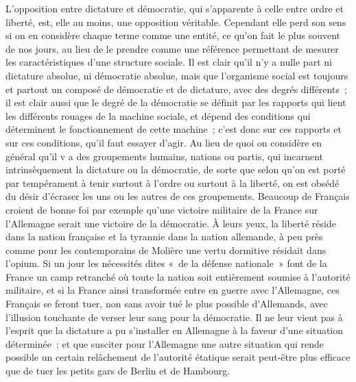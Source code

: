 \documentclass[french,twoside]{book} %
\begin{document}
L'opposition entre dictature et démocratie, qui s'apparente à celle entre ordre et liberté, est, elle au moins, une opposition véritable. Cependant elle perd son sens si on en considère chaque terme comme une entité, ce qu'on fait le plus souvent de nos jours, au lieu de le prendre comme une référence permettant de mesurer les caractéristiques d'une structure sociale. Il est clair qu'il n'y a nulle part ni dictature absolue, ni démocratie absolue, mais que l'organisme social est toujours et partout un composé de démocratie et de dictature, avec des degrés différents ; il est clair aussi que le degré de la démocratie se définit par les rapports qui lient les différents rouages de la machine sociale, et dépend des conditions qui déterminent le fonctionnement de cette machine ; c'est donc sur ces rapports et sur ces conditions, qu'il faut essayer d'agir. Au lieu de quoi on considère en général qu'il v a des groupe­ments humains, nations ou partis, qui incarnent intrinsèquement la dictature ou la démocratie, de sorte que selon qu'on est porté par tempérament à tenir surtout à l'ordre ou surtout à la liberté, on est obsédé du désir d'écraser les uns ou les autres de ces groupements. Beaucoup de Français croient de bonne foi par exemple qu'une victoire militaire de la France sur l'Allemagne serait une victoire de la démocratie. À leurs yeux, la liberté réside dans la nation française et la tyrannie dans la nation allemande, à peu près comme pour les contemporains de Molière une vertu dormitive résidait dans l'opium. Si un jour les nécessités dites « de la défense nationale » font de la France un camp retranché où toute la nation soit entièrement soumise à l'autorité militaire, et si la France ainsi transformée entre en guerre avec l'Allemagne, ces Français se feront tuer, non sans avoir tué le plus possible d'Allemands, avec l'illusion touchante de verser leur sang pour la démocratie. Il ne leur vient pas à l'esprit que la dictature a pu s'installer en Allemagne à la faveur d'une situation déterminée ; et que susciter pour l'Allemagne une autre situation qui rende possible un certain relâchement de l'autorité étatique serait peut-être plus efficace que de tuer les petits gars de Berlin et de Hambourg.\par
\end{document}
